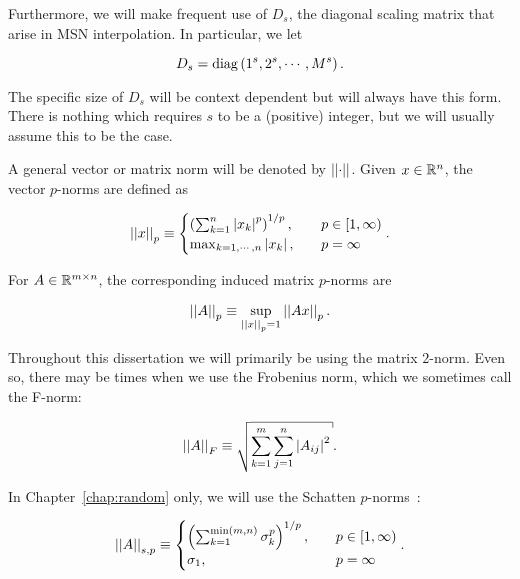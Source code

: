 Furthermore, we will make frequent use of $D_{s}$, the diagonal scaling
matrix that arise in MSN interpolation.
In particular, we let

\begin{equation}
    D_{s} = \operatorname{diag}\left( 1^{s},2^{s},\cdots,M^{s} \right).
    \label{eq:kar_ds_def}
\end{equation}

\noindent
The specific size of $D_{s}$ will be context dependent
but will always have this form.
There is nothing which requires $s$ to be a (positive) integer,
but we will usually assume this to be the case.

A general vector or matrix norm will be denoted by $\left| \left| \cdot \right| \right|$.
Given $x\in\mathbb{R}^{n}$, the vector $p$-norms are defined as

\begin{equation}
    \left| \left| x \right| \right|_{p} \equiv \begin{cases}
        \left( \sum_{k=1}^{n} \left| x_{k} \right|^{p} \right)^{1/p},\quad &p\in[1,\infty) \\
        \max_{k=1,\cdots,n} \left| x_{k} \right|,\quad &p=\infty
    \end{cases}.
\end{equation}

\noindent
For $A\in\mathbb{R}^{m\times n}$, the corresponding induced matrix $p$-norms are

\begin{equation}
    \left| \left| A \right| \right|_{p} \equiv \sup_{\left| \left| x \right| \right|_{p}=1} \left| \left| Ax \right| \right|_{p}.
\end{equation}

\noindent
Throughout this dissertation we will primarily be using the matrix $2$-norm.
Even so, there may be times when we use the Frobenius norm, which we sometimes
call the F-norm:

\begin{equation}
    \norm{A}_{F} \equiv \sqrt{\sum_{k=1}^{m}\sum_{j=1}^{n} \abs{A_{ij}}^{2}}.
\end{equation}

In Chapter~\ref{chap:random} only, we will use the
Schatten $p$-norms~\cite[Chapter 4]{bhatia2013matrix}:

\begin{equation}
    \left| \left| A \right| \right|_{s,p} \equiv \begin{cases}
        \left( \sum_{k=1}^{\min(m,n)}\sigma_{k}^{p} \right)^{1/p},\quad
            &p\in[1,\infty) \\
        \sigma_{1},\quad &p=\infty
    \end{cases}.
    \label{eq:kar_schatten_def}
\end{equation}

